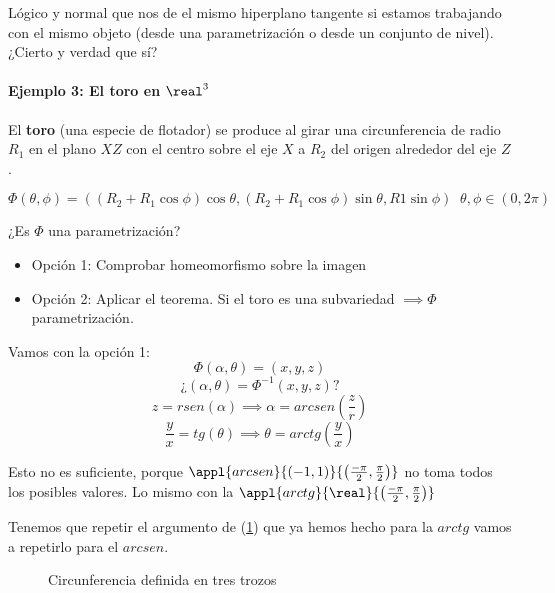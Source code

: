 Lógico y normal que nos de el mismo hiperplano tangente si estamos trabajando con el mismo objeto (desde una parametrización o desde un conjunto de nivel). ¿Cierto y verdad que sí?

\paragraph{Ejemplo 3: El toro en $\real^3$}

El \textbf{toro} (una especie de flotador) se produce al girar una circunferencia de radio $R_1$ en el plano $XZ$ con el centro sobre el eje $X$ a $R_2$ del origen alrededor del eje $Z$.

\[ \Phi(\theta, \phi) = ((R_2+R_1\cos\phi)\cos\theta,(R_2+R_1\cos\phi)\sin \theta,R1\sin \phi)\;\; \theta, \phi \in (0, 2\pi) \]


¿Es $\Phi$ una parametrización? 
\begin{itemize}
\item Opción 1: Comprobar homeomorfismo sobre la imagen
\item Opción 2: Aplicar el teorema. Si el toro es una subvariedad $\implies \Phi$ parametrización.
\end{itemize}

Vamos con la opción 1:
\[\Phi(\alpha,\theta) = (x,y,z)\]
\[¿(\alpha,\theta) = \Phi^{-1} (x,y,z)?\]
\[z = rsen(\alpha) \implies \alpha = arcsen\left(\frac{z}{r}\right)\]
\[\frac{y}{x} = tg(\theta) \implies \theta = arctg \left(\frac{y}{x}\right)\]


Esto no es suficiente, porque $\appl{arcsen}{(-1,1)}{\left(\frac{-\pi}{2},\frac{\pi}{2}\right)}$ no toma todos los posibles valores. Lo mismo con la $\appl{arctg}{\real}{\left(\frac{-\pi}{2},\frac{\pi}{2}\right)}$

Tenemos que repetir el argumento de (\ref{imgCirc}) que ya hemos hecho para la $arctg$ vamos a repetirlo para el $arcsen$.

\begin{figure}[hbtp]
\begin{center}
\caption{Circunferencia definida en tres trozos}
\label{imgCirc}
\end{center}
\end{figure}


